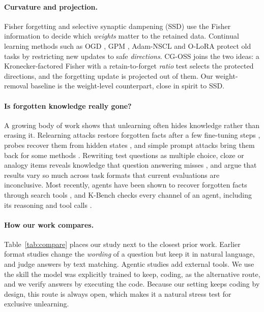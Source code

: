 \documentclass{article}
\begin{document}
\paragraph{Curvature and projection.}
Fisher forgetting \citep{golatkar2020eternal,golatkar2021mixed} and selective synaptic dampening (SSD) \citep{foster2024ssd} use the Fisher information to decide which \emph{weights} matter to the retained data. Continual learning methods such as OGD \citep{farajtabar2020ogd}, GPM \citep{saha2021gpm}, Adam-NSCL \citep{wang2021adamnscl} and O-LoRA \citep{wang2023olora} protect old tasks by restricting new updates to safe \emph{directions}. CG-OSS joins the two ideas: a Kronecker-factored Fisher \citep{martens2015kfac} with a retain-to-forget \emph{ratio} test selects the protected directions, and the forgetting update is projected out of them. Our weight-removal baseline is the weight-level counterpart, close in spirit to SSD.

\paragraph{Is forgotten knowledge really gone?}
A growing body of work shows that unlearning often hides knowledge rather than erasing it. Relearning attacks restore forgotten facts after a few fine-tuning steps \citep{hu2024jogging,lynch2024eight,lo2024relearning}, probes recover them from hidden states \citep{patil2024sensitive}, and simple prompt attacks bring them back for some methods \citep{jang2025promptattacks}. Rewriting test questions as multiple choice, cloze or analogy items reveals knowledge that question answering misses \citep{joshi2024transformations}, and \citet{feng2025inconclusive} argue that results vary so much across task formats that current evaluations are inconclusive. Most recently, agents have been shown to recover forgotten facts through search tools \citep{chen2026atu}, and K-Bench checks every channel of an agent, including its reasoning and tool calls \citep{yu2026kbench}.

\paragraph{How our work compares.}
Table~\ref{tab:compare} places our study next to the closest prior work. Earlier format studies change the \emph{wording} of a question but keep it in natural language, and judge answers by text matching. Agentic studies add external tools. We use the skill the model was explicitly trained to keep, coding, as the alternative route, and we verify answers by executing the code. Because our setting keeps coding by design, this route is always open, which makes it a natural stress test for exclusive unlearning.
\end{document}
